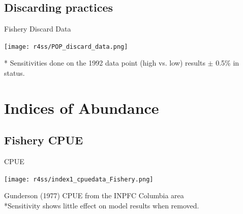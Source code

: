 \documentclass[pdf]{beamer}\usepackage[]{graphicx}\usepackage[]{color}
\begin{document}
\subsection{Discarding practices}
\begin{frame}{Fishery Discard Data}
  \begin{center}
    \texttt{[image: r4ss/POP\_discard\_data.png]}
  \end{center}
  * \small{Sensitivities done on the 1992 data point (high vs. low) results $\pm$ 0.5\%  in status.}
\end{frame}

\section{Indices of Abundance}
\subsection{Fishery CPUE}
\begin{frame}{CPUE}
  \begin{center}
      \texttt{[image: r4ss/index1\_cpuedata\_Fishery.png]}
  \end{center}
  Gunderson (1977) CPUE from the INPFC Columbia area\\
  *Sensitivity shows little effect on model results when removed.
\end{frame}
\end{document}
